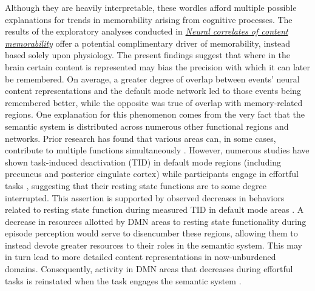 \documentclass{article}
\begin{document}
Although they are heavily interpretable, these wordles afford multiple possible explanations for trends in memorability arising from cognitive processes. The results of the exploratory analyses conducted in \hyperref[sec:brainresults]{\textit{Neural correlates of content memorability}} offer a potential complimentary driver of memorability, instead based solely upon physiology.  The present findings suggest that where in the brain certain content is represented may bias the precision with which it can later be remembered.  On average, a greater degree of overlap between events' neural content representations and the default mode network led to those events being remembered better, while the opposite was true of overlap with memory-related regions.  One explanation for this phenomenon comes from the very fact that the semantic system is distributed across numerous other functional regions and networks.  Prior research has found that various areas can, in some cases, contribute to multiple functions simultaneously \citep{SigmDeha08, CharKoec10, RishEtal13}.  However, numerous studies have shown task-induced deactivation (TID) in default mode regions (including precuneus and posterior cingulate cortex) while participants engage in effortful tasks \citep[e.g.,][]{BindEtal99, RaicEtal01, Raic06, McKiEtal06, WeisEtal06, BindEtal09, NakaEtal13}, suggesting that their resting state functions are to some degree interrupted.  This assertion is supported by observed decreases in behaviors related to resting state function during measured TID in default mode areas \citep{TeasEtal95, McKiEtal03, McKiEtal06}.  A decrease in resources allotted by DMN areas to resting state functionality during episode perception would serve to disencumber these regions, allowing them to instead devote greater resources to their roles in the semantic system.  This may in turn lead to more detailed content representations in now-unburdened domains.  Consequently, activity in DMN areas that decreases during effortful tasks is reinstated when the task engages the semantic system \citep{BaumEtal02, HensEtal02, MechEtal03, RissEtal03, IschEtal04, BindEtal05, XiaoEtal05, HumpEtal07}.  
\end{document}
